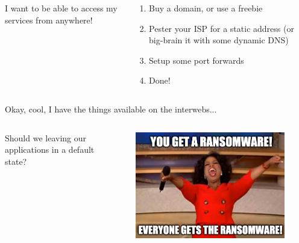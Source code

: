 \documentclass{beamer}
\begin{document}
\begin{frame}
    \begin{columns}
        \begin{column}{0.5\textwidth}
            I want to be able to access my services from anywhere!
        \end{column}
        \begin{column}{0.5\textwidth}
            \begin{enumerate}
                \item Buy a domain, or use a freebie
                \item Pester your ISP for a static address (or big-brain it with some dynamic DNS)
                \item Setup some port forwards
                \item Done!
            \end{enumerate}
        \end{column}
    \end{columns}
\end{frame}

\begin{frame}
    Okay, cool, I have the things available on the interwebs...
\end{frame}


\begin{frame}
    \begin{columns}
        \begin{column}{0.5\textwidth}
            Should we leaving our applications in a default state?
        \end{column}
        \begin{column}{0.5\textwidth}
            \begin{figure}
                \centering
                \includegraphics[width=1\textwidth,keepaspectratio]{../resources/oprah.png}
            \end{figure}
        \end{column}
    \end{columns}
\end{frame}
\end{document}
